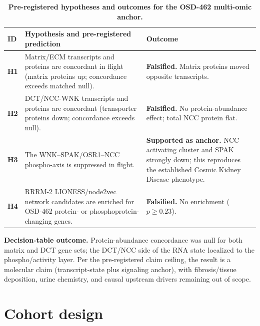 \documentclass[10pt]{article}
\begin{document}
\begin{table}[H]
\centering\small
\caption{\textbf{Pre-registered hypotheses and outcomes for the OSD-462 multi-omic anchor.}}
\label{tab:hyp}
\begin{tabularx}{\textwidth}{>{\bfseries}p{}X p{}}
\toprule
ID & Hypothesis and pre-registered prediction & Outcome \\
\midrule
H1 & Matrix/ECM transcripts and proteins are concordant in flight (matrix proteins up; concordance exceeds matched null). & \textbf{Falsified.} Matrix proteins moved opposite transcripts. \\
H2 & DCT/NCC-WNK transcripts and proteins are concordant (transporter proteins down; concordance exceeds null). & \textbf{Falsified.} No protein-abundance effect; total NCC protein flat. \\
H3 & The WNK--SPAK/OSR1--NCC phospho-axis is suppressed in flight. & \textbf{Supported as anchor.} NCC activating cluster and SPAK strongly down; this reproduces the established Cosmic Kidney Disease phenotype. \\
H4 & RRRM-2 LIONESS/node2vec network candidates are enriched for OSD-462 protein- or phosphoprotein-changing genes. & \textbf{Falsified.} No enrichment ($p\geq0.23$). \\
\bottomrule
\end{tabularx}
\end{table}

\noindent
\textbf{Decision-table outcome.} Protein-abundance concordance was null for both matrix and DCT gene sets; the DCT/NCC side of the RNA state localized to the phospho/activity layer. Per the pre-registered claim ceiling, the result is a molecular claim (transcript-state plus signaling anchor), with fibrosis/tissue deposition, urine chemistry, and causal upstream drivers remaining out of scope.

\section{Cohort design}
\end{document}
